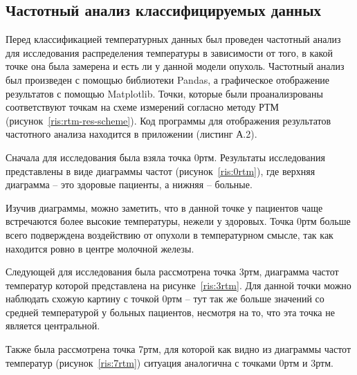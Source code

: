 \subsection{Частотный анализ классифицируемых данных}
Перед классификацией температурных данных был проведен частотный анализ для исследования распределения температуры в зависимости от того, в какой точке она была замерена и есть ли у данной модели опухоль. Частотный анализ был произведен с помощью библиотеки Pandas, а графическое отображение результатов с помощью Matplotlib. Точки, которые были проанализрованы соответствуют точкам на схеме измерений согласно методу РТМ (рисунок~\ref{ris:rtm-res-scheme}). Код программы для отображения результатов частотного анализа находится в приложении (листинг А.2).
\par
Сначала для исследования была взяла точка 0ртм. Результаты исследования представлены в виде диаграммы частот (рисунок~\ref{ris:0rtm}), где верхняя диаграмма -- это здоровые пациенты, а нижняя -- больные.
\par
Изучив диаграммы, можно заметить, что в данной точке у пациентов чаще встречаются более высокие температуры, нежели у здоровых. Точка 0ртм больше всего подверждена воздействию от опухоли в температурном смысле, так как находится ровно в центре молочной железы.
\par
Следующей для исследования была рассмотрена точка 3ртм, диаграмма частот температур которой представлена на рисунке~\ref{ris:3rtm}. Для данной точки можно наблюдать схожую картину с точкой 0ртм -- тут так же больше значений со средней температурой у больных пациентов, несмотря на то, что эта точка не является центральной.
\par
Также была рассмотрена точка 7ртм, для которой как видно из диаграммы частот температур (рисунок~\ref{ris:7rtm}) ситуация аналогична с точками 0ртм и 3ртм.


